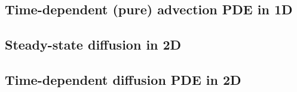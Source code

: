 \newpage
\subsection{Time-dependent (pure) advection PDE in 1D}


\subsection{Steady-state diffusion in 2D}

\subsection{Time-dependent diffusion PDE in 2D}






%


